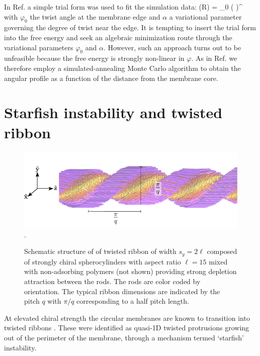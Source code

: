 In Ref. \cite{kuhnhold2022colloidal} a simple trial form was used to fit the simulation data:
\beq
\varphi(R) = \varphi_{0} \left (  \right )^{\alpha} 
\eeq
with $\varphi_{0}$ the twist angle at the membrane edge and $\alpha $ a variational parameter governing the degree of twist near the edge.  It is tempting to insert the trial form into the free energy  and seek an algebraic minimization route through the variational parameters $\varphi_{0}$ and $\alpha$.   However, such an approach turns out to be  unfeasible because the free energy is strongly non-linear in $\varphi$.  As in Ref. \cite{wensink2018elastic} we therefore employ a simulated-annealing Monte Carlo algorithm to obtain the angular profile as a function of the distance from the membrane core.

\section{Starfish instability and twisted ribbon}


\begin{figure}
\begin{center}
\includegraphics[width= \columnwidth]{figures/chapter-5/ribbon_sketch}.
\caption[Schematic structure of of twisted ribbon]{ \label{ribsnap} Schematic structure of of twisted ribbon of width $s_y=2\ell$ composed of strongly chiral spherocylinders with aspect ratio $\ell = 15$ mixed with non-adsorbing polymers (not shown) providing strong depletion attraction between the rods. The rods are color coded by orientation. The typical  ribbon dimensions are indicated by the pitch $q$ with $\pi/q$ corresponding to a half pitch length.  }
\end{center}
\end{figure}

At elevated chiral strength the circular membranes are known to transition into twisted ribbons \cite{Gibaud2012}. These were identified as quasi-1D twisted protrusions growing out of the perimeter of the membrane, through a mechanism termed `starfish' instability.


